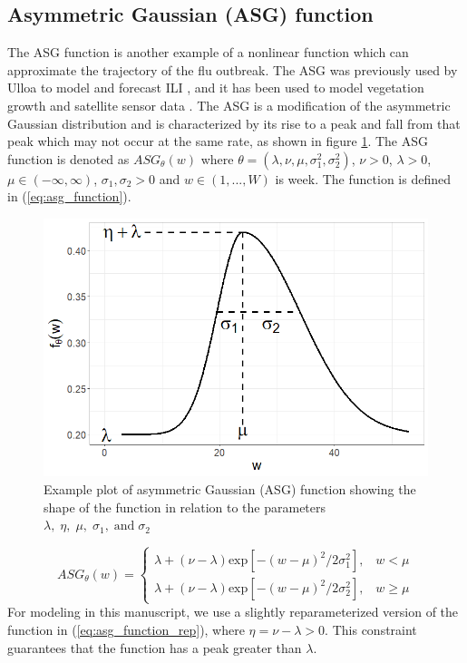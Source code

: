 \documentclass[ba]{imsart}
\theoremstyle{plain}
\theoremstyle{definition}
\theoremstyle{remark}
\begin{document}
\subsection{Asymmetric Gaussian (ASG) function} \label{sec:asg_func}
The ASG function is another example of a nonlinear function which can approximate the trajectory of the flu outbreak. The ASG was previously used by Ulloa to model and forecast ILI \cite[]{ulloa2019}, and it has been used to model vegetation growth and satellite sensor data \cite[]{lewis2020extracting, jonsson2002seasonality, hird2009noise, beck2006improved, atkinson2012inter}. The ASG is a modification of the asymmetric Gaussian distribution \cite[]{wallis2014two} and is characterized by its rise to a peak and fall from that peak which may not occur at the same rate, as shown in figure \ref{fig:asg_function}. The ASG function is denoted as $ASG_\theta(w)$ where $\theta = (\lambda, \nu, \mu, \sigma_1^2, \sigma_2^2)$, $\nu > 0$, $\lambda > 0$, $\mu \in (-\infty, \infty)$, $\sigma_1, \sigma_2 > 0$ and $w \in (1, ..., W)$ is week. The function is defined in (\ref{eq:asg_function}).

\begin{figure}
    \centering
    \includegraphics[scale=.45]{Images/asg_function.png}
    \caption{Example plot of asymmetric Gaussian (ASG) function showing the shape of the function in relation to the parameters $\lambda, \; \eta, \; \mu, \; \sigma_1, \; \text{and} \; \sigma_2$}
    \label{fig:asg_function}
\end{figure}

\begin{equation}
    \label{eq:asg_function}
    ASG_{\theta}(w) = 
    \begin{cases}
        \lambda + (\nu - \lambda) \text{exp}[-(w - \mu)^2/2\sigma^2_1], \;\;\; w < \mu \\
        \lambda + (\nu - \lambda) \text{exp}[-(w - \mu)^2/2\sigma^2_2], \;\;\; w \geq \mu
    \end{cases}
\end{equation}
For modeling in this manuscript, we use a slightly reparameterized version of the function in (\ref{eq:asg_function_rep}), where $\eta = \nu - \lambda > 0$. This constraint guarantees that the function has a peak greater than $\lambda$.
\end{document}
